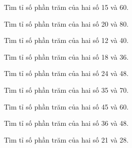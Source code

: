 
\begin{ex}
  Tìm tỉ số phần trăm của hai số 15 và 60.
\end{ex}

\begin{ex}
  Tìm tỉ số phần trăm của hai số 20 và 80.
\end{ex}

\begin{ex}
  Tìm tỉ số phần trăm của hai số 12 và 40.
\end{ex}

\begin{ex}
  Tìm tỉ số phần trăm của hai số 18 và 36.
\end{ex}

\begin{ex}
  Tìm tỉ số phần trăm của hai số 24 và 48.
\end{ex}

\begin{ex}
  Tìm tỉ số phần trăm của hai số 35 và 70.
\end{ex}

\begin{ex}
  Tìm tỉ số phần trăm của hai số 45 và 60.
\end{ex}

\begin{ex}
  Tìm tỉ số phần trăm của hai số 36 và 48.
\end{ex}

\begin{ex}
  Tìm tỉ số phần trăm của hai số 21 và 28.
\end{ex}


